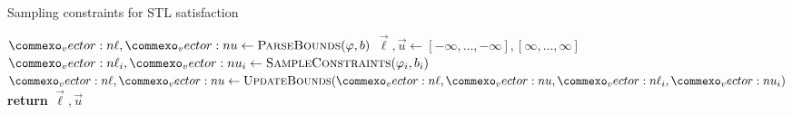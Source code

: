 \begin{algorithm}
\caption{Sampling constraints for STL satisfaction}
    \label{alg:sampling_constraints}
\begin{algorithmic}[1]
 \label{line:sc_init_upper}
    \label{line:sc_is_comparison}
        \State  $\vec{\ell}, \vec{u} \gets \textproc{ParseBounds}(\varphi, b)$ \label{line:sc_parse_bounds}
    \Else
        \State $\vec{\ell}, \vec{u} \gets [-\infty, \ldots, -\infty], [\infty, \ldots, \infty]$ \label{line:sc_init_lower}
         \label{line:sc_children}
            \State $\vec{\ell}_i, \vec{u}_i \gets \textproc{SampleConstraints}(\varphi_i, b_i)$ \label{line:sc_recurse}    
            \State $\vec{\ell}, \vec{u} \gets \textproc{UpdateBounds}(\vec{\ell}, \vec{u}, \vec{\ell}_i, \vec{u}_i)$ \label{line:sc_update_bounds}
        \EndFor
    \EndIf
    \State \textbf{return} $\vec{\ell}, \vec{u}$ \label{line:sc_return}
    \EndFunction
\end{algorithmic}
\end{algorithm}


